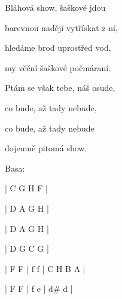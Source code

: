 \zr
Bláhová show, šaškové jdou

barevnou naději vytřískat z ní,

hledáme brod uprostřed vod,

my věční šaškové počmáraní.
\kr

\zs
Ptám se však tebe, náš osude,

co bude, až tady nebude,

co bude, až tady nebude

dojemně pitomá show.
\ks

\ifdefined\TPBAND
    Basa:
    
    | C G H F |
    
    | D A G H |
    
    | D A G H |
    
    | D G C G | 
    
    \zr
    | F F | f  f | C H B A |
    
    | F F | f  e | d\# d |
    \kr
\fi

\kp
